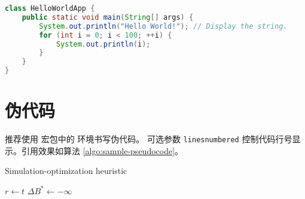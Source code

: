 \noindent%
\begin{minipage}{\linewidth}
\begin{lstlisting}[language=java,caption={Java 代码示例（使用 \pkg{listings} 高亮）},xleftmargin=20pt,label={lst:sample-code-listings}]
class HelloWorldApp {
    public static void main(String[] args) {
        System.out.println("Hello World!"); // Display the string.
        for (int i = 0; i < 100; ++i) {
            System.out.println(i);
        }
    }
}
\end{lstlisting}
\end{minipage}

\section{伪代码}


推荐使用  宏包中的  环境书写伪代码。 可选参数 \verb|linesnumbered| 控制代码行号显示。引用效果如算法 \ref{algo:sample-pseudocode}。

\begin{algorithm}
  \caption{Simulation-optimization heuristic}
  \label{algo:sample-pseudocode}
  $r\leftarrow t$\;
  $\Delta B^{\ast}\leftarrow -\infty$\;
\end{algorithm}

